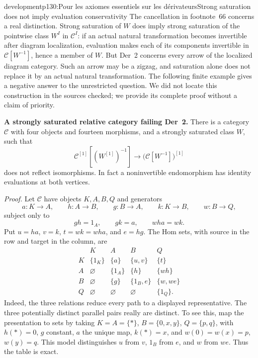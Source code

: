 \begin{dcomment}{development}{p130:Pour les axiomes essentiels sur les dérivateurs}{Strong saturation does not imply evaluation conservativity}
The cancellation in footnote~66 concerns a real distinction. Strong saturation of $W$ does imply strong saturation of the pointwise class $W^I$ in $\mathcal C^I$: if an actual natural transformation becomes invertible after diagram localization, evaluation makes each of its components invertible in $\mathcal C[W^{-1}]$, hence a member of $W$. But Der~2 concerns every arrow of the localized diagram category. Such an arrow may be a zigzag, and saturation alone does not replace it by an actual natural transformation. The following finite example gives a negative answer to the unrestricted question. We did not locate this construction in the sources checked; we provide its complete proof without a claim of priority.

\textbf{A strongly saturated relative category failing Der~2.}\ours\quad
There is a category $\mathcal C$ with four objects and fourteen morphisms, and a strongly saturated class $W$, such that
\[
\mathcal C^{[1]}[(W^{[1]})^{-1}]
\longrightarrow
\bigl(\mathcal C[W^{-1}]\bigr)^{[1]}
\]
does not reflect isomorphisms. In fact a noninvertible endomorphism has identity evaluations at both vertices.

\textit{Proof.}
Let $\mathcal C$ have objects $K,A,B,Q$ and generators
\[
a:K\to A,\qquad h:A\to B,\qquad g:B\to A,
\qquad k:K\to B,\qquad w:B\to Q,
\]
subject only to
\[
gh=1_A,\qquad gk=a,\qquad wha=wk.
\]
Put $u=ha$, $v=k$, $t=wk=wha$, and $e=hg$. The Hom sets, with source in the row and target in the column, are
\[
\begin{array}{c|cccc}
 &K&A&B&Q\\ \hline
K&\{1_K\}&\{a\}&\{u,v\}&\{t\}\\
A&\varnothing&\{1_A\}&\{h\}&\{wh\}\\
B&\varnothing&\{g\}&\{1_B,e\}&\{w,we\}\\
Q&\varnothing&\varnothing&\varnothing&\{1_Q\}.
\end{array}
\]
Indeed, the three relations reduce every path to a displayed representative. The three potentially distinct parallel pairs really are distinct. To see this, map the presentation to sets by taking $K=A=\{*\}$, $B=\{0,x,y\}$, $Q=\{p,q\}$, with $h(*)=0$, $g$ constant, $a$ the unique map, $k(*)=x$, and $w(0)=w(x)=p$, $w(y)=q$. This model distinguishes $u$ from $v$, $1_B$ from $e$, and $w$ from $we$. Thus the table is exact.


\end{dcomment}
